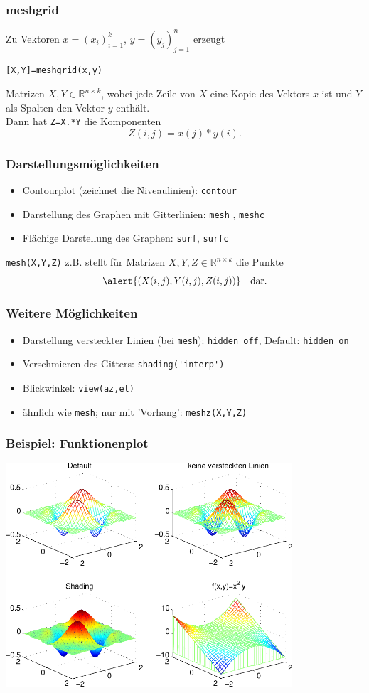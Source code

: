 % 
% 
\begin{frame}[fragile]\frametitle{meshgrid}
Zu Vektoren $x=(x_i)_{i=1}^k$, $y=(y_j)_{j=1}^n$ erzeugt 
\begin{lstlisting}
[X,Y]=meshgrid(x,y)
\end{lstlisting}
Matrizen $X,Y \in \mathbb{R}^{n \times k}$, wobei jede Zeile von $X$
eine Kopie des Vektors $x$ ist und $Y$ als Spalten den Vektor $y$
enthält. \\
Dann hat \alert{ \lstinline!Z=X.*Y!} die Komponenten 
\[ Z(i,j)=x(j)*y(i). \]
\end{frame}
% 
% 
\begin{frame}[fragile]\frametitle{Darstellungsmöglichkeiten}
\begin{itemize}
\item Contourplot (zeichnet die Niveaulinien): \alert{ \lstinline!contour!}
\item Darstellung des Graphen mit Gitterlinien: \alert{ \lstinline!mesh! ,
  \lstinline!meshc!} 
\item Flächige Darstellung des Graphen: \alert{ \lstinline!surf!, \lstinline!surfc!}
\end{itemize} 

\alert{ \lstinline!mesh(X,Y,Z)!} z.B. stellt für Matrizen $X,Y,Z \in
\mathbb{R}^{n \times k}$ die Punkte 
\[\alert{  (X(i,j), Y(i,j), Z(i,j))} \quad \mbox{dar.}\]
\end{frame}
% 
% 
\begin{frame}[fragile]\frametitle{Weitere Möglichkeiten}
\begin{itemize}
\item Darstellung versteckter Linien (bei \lstinline!mesh!): \alert{ \lstinline!hidden off!}, Default:
\alert{ \lstinline!hidden on!}
\item Verschmieren des Gitters: \alert{ \lstinline!shading('interp')!}
\item Blickwinkel: \alert{ \lstinline!view(az,el)!}
\item ähnlich wie \lstinline!mesh!; nur mit 'Vorhang': \alert{
  \lstinline!meshz(X,Y,Z)!}
\end{itemize}
\end{frame}
% 
% 
\begin{frame}[fragile]\frametitle{Beispiel: Funktionenplot}
\hfil\includegraphics[width=0.8\textwidth]{./figures/beispiel_function_plot_3d_2}\hfil
\end{frame}
